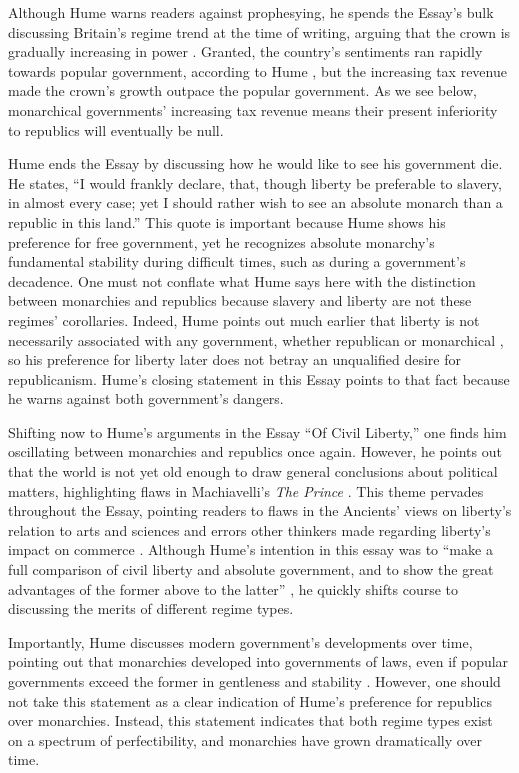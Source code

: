 \documentclass[authordate]{turabian-researchpaper}
\begin{document}
Although Hume warns readers against prophesying, he spends the Essay’s bulk discussing Britain’s regime trend at the time of writing, arguing that the crown is gradually increasing in power \autocite[51]{Hume_1985}. Granted, the country’s sentiments ran rapidly towards popular government, according to Hume \autocite[51]{Hume_1985}, but the increasing tax revenue made the crown’s growth outpace the popular government. As we see below, monarchical governments’ increasing tax revenue means their present inferiority to republics will eventually be null. 

Hume ends the Essay by discussing how he would like to see his government die. He states, “I would frankly declare, that, though liberty be preferable to slavery, in almost every case; yet I should rather wish to see an absolute monarch than a republic in this land.”\autocite[52]{Hume_1985} This quote is important because Hume shows his preference for free government, yet he recognizes absolute monarchy’s fundamental stability during difficult times, such as during a government’s decadence. One must not conflate what Hume says here with the distinction between monarchies and republics because slavery and liberty are not these regimes’ corollaries. Indeed, Hume points out much earlier that liberty is not necessarily associated with any government, whether republican or monarchical \autocite[9-10]{Hume_1985}, so his preference for liberty later does not betray an unqualified desire for republicanism. Hume’s closing statement in this Essay points to that fact because he warns against both government’s dangers.\autocite[53]{Hume_1985}

Shifting now to Hume’s arguments in the Essay “Of Civil Liberty,” one finds him oscillating between monarchies and republics once again. However, he points out that the world is not yet old enough to draw general conclusions about political matters, highlighting flaws in Machiavelli’s \emph{The Prince} \autocite[87-9]{Hume_1985}. This theme pervades throughout the Essay, pointing readers to flaws in the Ancients’ views on liberty’s relation to arts and sciences and errors other thinkers made regarding liberty’s impact on commerce \autocite[89-93]{Hume_1985}. Although Hume’s intention in this essay was to “make a full comparison of civil liberty and absolute government, and to show the great advantages of the former above to the latter” \autocite[89]{Hume_1985}, he quickly shifts course to discussing the merits of different regime types. 

Importantly, Hume discusses modern government’s developments over time, pointing out that monarchies developed into governments of laws, even if popular governments exceed the former in gentleness and stability \autocite[94]{Hume_1985}. However, one should not take this statement as a clear indication of Hume’s preference for republics over monarchies. Instead, this statement indicates that both regime types exist on a spectrum of perfectibility, and monarchies have grown dramatically over time.
\end{document}
